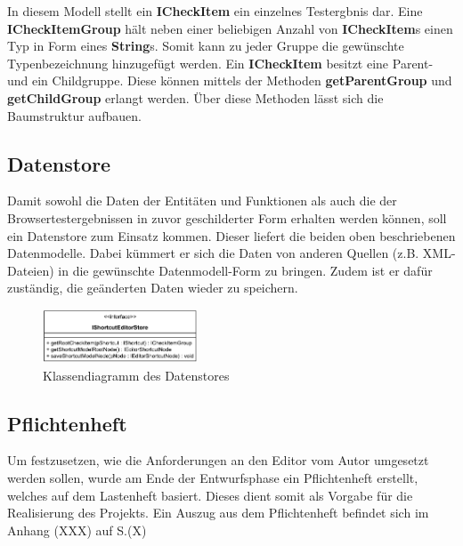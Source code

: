 In diesem Modell stellt ein \textbf{ICheckItem} ein einzelnes Testergbnis dar. Eine \textbf{ICheckItemGroup} hält neben einer beliebigen Anzahl von \textbf{ICheckItem}s einen Typ in Form eines \textbf{String}s. Somit kann zu jeder Gruppe die gewünschte Typenbezeichnung hinzugefügt werden. Ein \textbf{ICheckItem} besitzt eine Parent- und ein Childgruppe. Diese können mittels der Methoden \textbf{getParentGroup} und \textbf{getChildGroup} erlangt werden. Über diese Methoden lässt sich die Baumstruktur aufbauen.

\vspace{-5px}

\subsection{Datenstore}

Damit sowohl die Daten der Entitäten und Funktionen als auch die der Browsertestergebnissen in zuvor geschilderter Form erhalten werden können, soll ein Datenstore zum Einsatz kommen. Dieser liefert die beiden oben beschriebenen Datenmodelle. Dabei kümmert er sich die Daten von anderen Quellen (z.B. XML-Dateien) in die gewünschte Datenmodell-Form zu bringen. Zudem ist er dafür zuständig, die geänderten Daten wieder zu speichern.

\vspace{-2px}

\begin{figure}[H]
	\centering
	\includegraphics[height=60px]{../graphic/diagrams/CD_IShortcutEditorStore/IShortcutEditorStore}
	\caption{Klassendiagramm des Datenstores}
	\label{fig:ishortcuteditorstore}
\end{figure}

\vspace{-32px}

\subsection{Pflichtenheft}

Um festzusetzen, wie die Anforderungen an den Editor vom Autor umgesetzt werden sollen, wurde am Ende der Entwurfsphase ein Pflichtenheft erstellt, welches auf dem Lastenheft basiert. Dieses dient somit als Vorgabe für die Realisierung des Projekts. Ein Auszug aus dem Pflichtenheft befindet sich im Anhang (XXX) auf S.(X)



\newpage